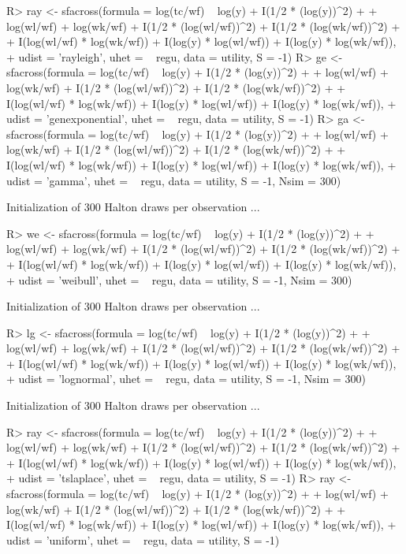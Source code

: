 \documentclass[nojss]{jss}
\begin{document}
\begin{Schunk}
\begin{Sinput}
R> ray <- sfacross(formula = log(tc/wf) ~ log(y) + I(1/2 * (log(y))^2) +
+   log(wl/wf) + log(wk/wf) + I(1/2 * (log(wl/wf))^2) + I(1/2 * (log(wk/wf))^2) +
+   I(log(wl/wf) * log(wk/wf)) + I(log(y) * log(wl/wf)) + I(log(y) * log(wk/wf)),
+   udist = 'rayleigh', uhet = ~ regu, data = utility, S = -1)
R> ge <- sfacross(formula = log(tc/wf) ~ log(y) + I(1/2 * (log(y))^2) +
+   log(wl/wf) + log(wk/wf) + I(1/2 * (log(wl/wf))^2) + I(1/2 * (log(wk/wf))^2) +
+   I(log(wl/wf) * log(wk/wf)) + I(log(y) * log(wl/wf)) + I(log(y) * log(wk/wf)),
+   udist = 'genexponential', uhet = ~ regu, data = utility, S = -1)
R> ga <- sfacross(formula = log(tc/wf) ~ log(y) + I(1/2 * (log(y))^2) +
+   log(wl/wf) + log(wk/wf) + I(1/2 * (log(wl/wf))^2) + I(1/2 * (log(wk/wf))^2) +
+   I(log(wl/wf) * log(wk/wf)) + I(log(y) * log(wl/wf)) + I(log(y) * log(wk/wf)),
+   udist = 'gamma', uhet = ~ regu, data = utility, S = -1, Nsim = 300)
\end{Sinput}
\begin{Soutput}
Initialization of 300 Halton draws per observation ...

\end{Soutput}
\begin{Sinput}
R> we <- sfacross(formula = log(tc/wf) ~ log(y) + I(1/2 * (log(y))^2) +
+   log(wl/wf) + log(wk/wf) + I(1/2 * (log(wl/wf))^2) + I(1/2 * (log(wk/wf))^2) +
+   I(log(wl/wf) * log(wk/wf)) + I(log(y) * log(wl/wf)) + I(log(y) * log(wk/wf)),
+   udist = 'weibull', uhet = ~ regu, data = utility, S = -1, Nsim = 300)
\end{Sinput}
\begin{Soutput}
Initialization of 300 Halton draws per observation ...

\end{Soutput}
\begin{Sinput}
R> lg <- sfacross(formula = log(tc/wf) ~ log(y) + I(1/2 * (log(y))^2) +
+   log(wl/wf) + log(wk/wf) + I(1/2 * (log(wl/wf))^2) + I(1/2 * (log(wk/wf))^2) +
+   I(log(wl/wf) * log(wk/wf)) + I(log(y) * log(wl/wf)) + I(log(y) * log(wk/wf)),
+   udist = 'lognormal', uhet = ~ regu, data = utility, S = -1, Nsim = 300)
\end{Sinput}
\begin{Soutput}
Initialization of 300 Halton draws per observation ...

\end{Soutput}
\begin{Sinput}
R> ray <- sfacross(formula = log(tc/wf) ~ log(y) + I(1/2 * (log(y))^2) +
+   log(wl/wf) + log(wk/wf) + I(1/2 * (log(wl/wf))^2) + I(1/2 * (log(wk/wf))^2) +
+   I(log(wl/wf) * log(wk/wf)) + I(log(y) * log(wl/wf)) + I(log(y) * log(wk/wf)),
+   udist = 'tslaplace', uhet = ~ regu, data = utility, S = -1)
R> ray <- sfacross(formula = log(tc/wf) ~ log(y) + I(1/2 * (log(y))^2) +
+   log(wl/wf) + log(wk/wf) + I(1/2 * (log(wl/wf))^2) + I(1/2 * (log(wk/wf))^2) +
+   I(log(wl/wf) * log(wk/wf)) + I(log(y) * log(wl/wf)) + I(log(y) * log(wk/wf)),
+   udist = 'uniform', uhet = ~ regu, data = utility, S = -1)
\end{Sinput}
\end{Schunk}
\end{document}
